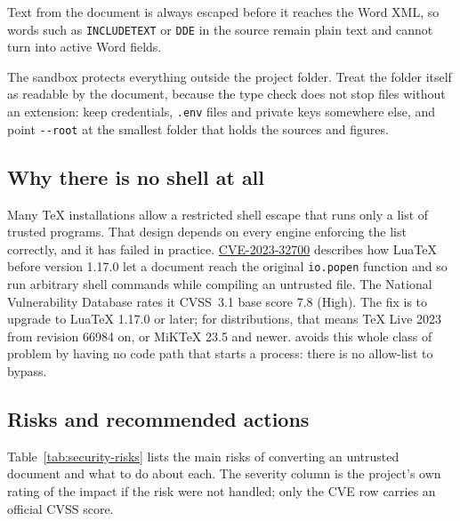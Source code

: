 Text from the document is always escaped before it reaches the Word XML, so
words such as \texttt{INCLUDETEXT} or \texttt{DDE} in the source remain plain
text and cannot turn into active Word fields.

\begin{tip}
The sandbox protects everything outside the project folder. Treat the folder
itself as readable by the document, because the type check does not stop
files without an extension: keep credentials, \texttt{.env} files and
private keys somewhere else, and point \verb|--root| at the smallest folder
that holds the sources and figures.
\end{tip}

\subsection{Why there is no shell at all}\label{sec:security-shell}

Many \TeX{} installations allow a restricted shell escape that runs only a
list of trusted programs. That design depends on every engine enforcing the
list correctly, and it has failed in practice.
\href{https://nvd.nist.gov/vuln/detail/cve-2023-32700}{CVE-2023-32700}
describes how LuaTeX before version 1.17.0 let a document reach the original
\texttt{io.popen} function and so run arbitrary shell commands while
compiling an untrusted file. The National Vulnerability Database rates it
CVSS~3.1 base score 7.8 (High). The fix is to upgrade to LuaTeX 1.17.0 or
later; for distributions, that means TeX Live 2023 from revision 66984 on,
or MiK\TeX{} 23.5 and newer. \texdocx{} avoids this whole class of
problem by having no code path that starts a process: there is no allow-list
to bypass.

\subsection{Risks and recommended actions}\label{sec:security-risks}

Table~\ref{tab:security-risks} lists the main risks of converting an
untrusted document and what to do about each. The severity column is the
\texdocx{} project's own rating of the impact if the risk were not handled;
only the CVE row carries an official CVSS score.


